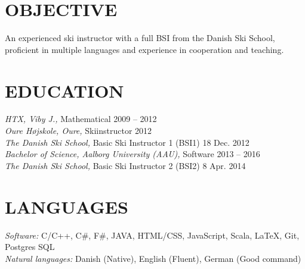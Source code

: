 \documentclass[margin, 10pt]{res} %
\begin{document}
\begin{resume}

 
\section{OBJECTIVE}  

An experienced ski instructor with a full BSI from the Danish Ski School, proficient in multiple languages and experience in cooperation and teaching.


\section{EDUCATION}

{\sl HTX, Viby J.,} Mathematical \hfill 2009 -- 2012 \\
{\sl Oure Højskole, Oure,} Skiinstructor \hfill 2012 \\
{\sl The Danish Ski School,} Basic Ski Instructor 1 (BSI1) \hfill 18 Dec. 2012 \\
{\sl Bachelor of Science, Aalborg University (AAU),} Software \hfill 2013 -- 2016 \\
{\sl The Danish Ski School,} Basic Ski Instructor 2 (BSI2) \hfill 8 Apr. 2014
 
\section{LANGUAGES} 

{\sl Software:} 
C/C++, C\#, F\#, JAVA, HTML/CSS, JavaScript, Scala, LaTeX, Git, Postgres SQL \\
{\sl Natural languages:}
{Danish (Native), English (Fluent), German (Good command)}
 


\end{resume}
\end{document}
